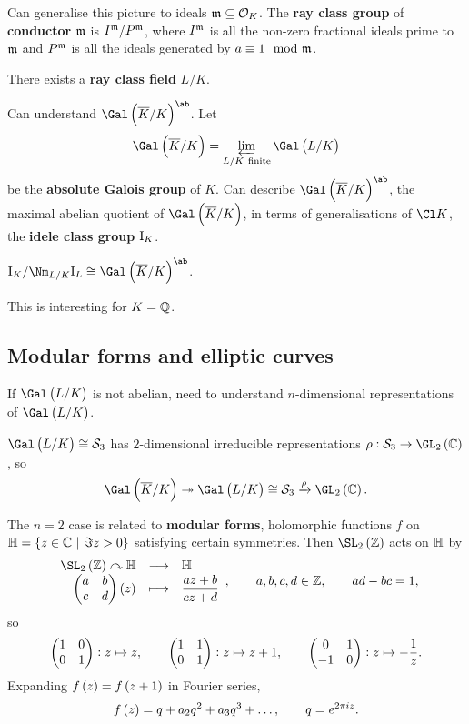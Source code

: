 \pagebreak

Can generalise this picture to ideals $ \mathfrak{m} \subseteq \mathcal{O}_K $. The \textbf{ray class group} of \textbf{conductor} $ \mathfrak{m} $ is $ I^{\mathfrak{m}} / P^{\mathfrak{m}} $, where $ I^{\mathfrak{m}} $ is all the non-zero fractional ideals prime to $ \mathfrak{m} $ and $ P^{\mathfrak{m}} $ is all the ideals generated by $ a \equiv 1 \mod {\mathfrak{m}} $.

\begin{theorem}
There exists a \textbf{ray class field} $ L / K $.
\end{theorem}

Can understand $ \Gal\br{\overline{K} / K}^{\ab} $. Let
$$ \Gal\br{\overline{K} / K} = \varprojlim_{L / K \ \text{finite}} \Gal\br{L / K} $$
be the \textbf{absolute Galois group} of $ K $. Can describe $ \Gal\br{\overline{K} / K}^{\ab} $, the maximal abelian quotient of $ \Gal\br{\overline{K} / K} $, in terms of generalisations of $ \Cl K $, the \textbf{idele class group} $ \mathrm{I}_K $.

\begin{theorem}
$ \I_K / \Nm_{L / K} \I_L \cong \Gal\br{\overline{K} / K}^{\ab} $.
\end{theorem}

This is interesting for $ K = \mathbb{Q} $.

\subsection{Modular forms and elliptic curves}

If $ \Gal\br{L / K} $ is not abelian, need to understand $ n $-dimensional representations of $ \Gal\br{L / K} $.

\begin{example*}
$ \Gal\br{L / K} \cong \SSS_3 $ has $ 2 $-dimensional irreducible representations $ \rho : \SSS_3 \to \GL_2\br{\CC} $, so
$$ \Gal\br{\overline{K} / K} \twoheadrightarrow \Gal\br{L / K} \cong \SSS_3 \xrightarrow{\rho} \GL_2\br{\CC}. $$
\end{example*}

The $ n = 2 $ case is related to \textbf{modular forms}, holomorphic functions $ f $ on $ \HH = \cbr{z \in \CC \st \Im z > 0} $ satisfying certain symmetries. Then $ \SL_2\br{\ZZ} $ acts on $ \mathbb{H} $ by
$$ \function{\SL_2\br{\ZZ} \curvearrowright \HH}{\HH}{\twobytwo{a}{b}{c}{d}\br{z}}{\dfrac{az + b}{cz + d}}, \qquad a, b, c, d \in \ZZ, \qquad ad - bc = 1, $$
so
$$ \begin{pmatrix} 1 & 0 \\ 0 & 1 \end{pmatrix} : z \mapsto z, \qquad \begin{pmatrix} 1 & 1 \\ 0 & 1 \end{pmatrix} : z \mapsto z + 1, \qquad \begin{pmatrix} 0 & 1 \\ -1 & 0 \end{pmatrix} : z \mapsto -\dfrac{1}{z}. $$
Expanding $ f\br{z} = f\br{z + 1} $ in Fourier series,
$$ f\br{z} = q + a_2q^2 + a_3q^3 + \dots, \qquad q = e^{2\pi iz}. $$

